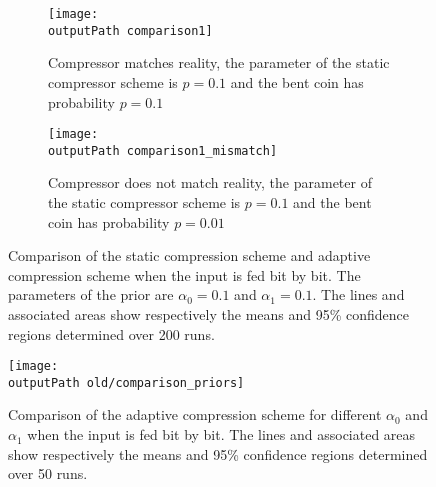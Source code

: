 \documentclass[letterpaper,11pt]{extarticle}
\newcommand{\outputPath}{output/}
\begin{document}
\begin{figure}[ht]
    \centering
    \begin{subfigure}{.49\linewidth}
        \texttt{[image: \\outputPath comparison1]}
        \caption{Compressor matches reality, the parameter of the static compressor scheme is $p=0.1$ and the bent coin has probability $p=0.1$}
    \end{subfigure}
    \begin{subfigure}{.49\linewidth}
        \texttt{[image: \\outputPath comparison1\_mismatch]}
        \caption{Compressor does not match reality, the parameter of the static compressor scheme is $p=0.1$ and the bent coin has probability $p=0.01$}
    \end{subfigure}
    \caption{Comparison of the static compression scheme and adaptive compression scheme when the input is fed bit by bit. The parameters of the prior are $\alpha_0=0.1$ and $\alpha_1=0.1$. The lines and associated areas show respectively the means and 95\% confidence regions determined over 200 runs.}
    \label{fig:comparison_mismatch}
\end{figure}


\begin{figure}[ht]
    \centering
    \texttt{[image: \\outputPath old/comparison\_priors]}
    \caption{Comparison of the adaptive compression scheme for different $\alpha_0$ and $\alpha_1$ when the input is fed bit by bit. The lines and associated areas show respectively the means and 95\% confidence regions determined over 50 runs.}
    \label{fig:comparison_priors}
\end{figure}

\endgroup
\printbibliography
\end{document}
